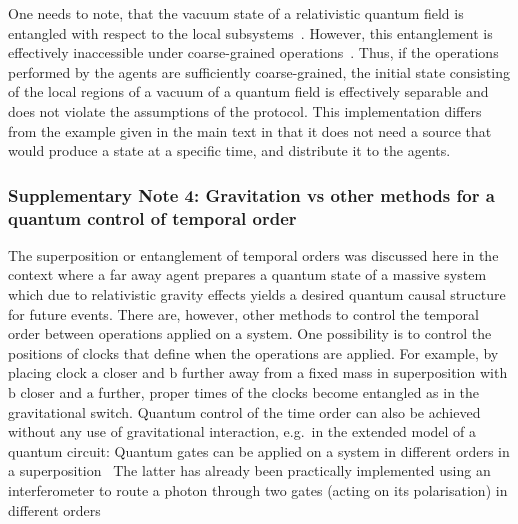 \documentclass[a4paper,11pt]{article}
\begin{document}
One needs to note, that the vacuum state of a relativistic quantum field is entangled with respect to the local subsystems~\cite{ReehSchlieders:1961, SummersWerner:1987part1, SummersWerner:1987part2}. However,  this entanglement is effectively inaccessible under coarse-grained operations~\cite{Zych:2010}. Thus, if the operations performed by the agents are sufficiently coarse-grained, the initial state consisting of the local regions of a vacuum of a quantum field is effectively separable and does not violate the assumptions of the protocol. This implementation %
{differs from the example given in the main text} in that {it does not need a source that would produce a state at a specific time, and distribute it to the agents.}


\subsubsection*{Supplementary Note 4: Gravitation vs other methods for a quantum control of temporal order}

The superposition or entanglement of temporal orders was discussed here in the context %
where a far away agent prepares a quantum state of a massive system which due to relativistic gravity effects yields a desired quantum causal structure for future events. 
There are, however, other methods to control the temporal order between operations applied on a system. One possibility is to control the positions of clocks that define when the operations are applied. For example, by placing clock $\mathrm a$ closer and $\mathrm b$ further away from a fixed mass in superposition with  $\mathrm b$ closer and $\mathrm a$ further, proper times of the clocks become entangled as in the gravitational switch. Quantum control of the time order can also be achieved without any use of gravitational interaction, e.g.~in the extended model of a quantum circuit: Quantum gates can be applied on a system in different orders in a superposition~\cite{Chiribella:2013, Chiribella:2012, Colnaghi:2012, Araujo:2014}
The latter has already been practically implemented using an interferometer to route a photon through two gates (acting on its polarisation) in different orders~\cite{procopio_experimental_2014, Rubinoe1602589, rubino2017experimental, Goswami2018, goswami2018communicating, Wei2019, guo2018experimental}
\end{document}
